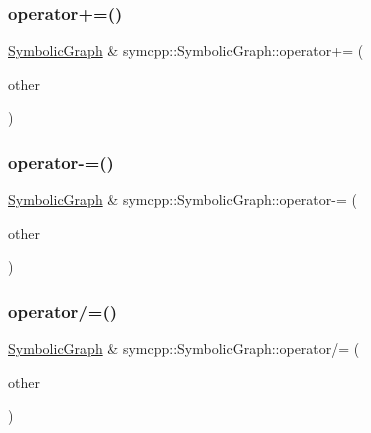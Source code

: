 \mbox{\label{classsymcpp_1_1SymbolicGraph_a9db383e72ce51ecfb967fff84d5a3723}} 
\subsubsection{\texorpdfstring{operator+=()}{operator+=()}}
{\footnotesize\ttfamily \mbox{\hyperlink{classsymcpp_1_1SymbolicGraph}{Symbolic\+Graph}} \& symcpp\+::\+Symbolic\+Graph\+::operator+= (\begin{DoxyParamCaption}\item[{const \mbox{\hyperlink{classsymcpp_1_1SymbolicGraph}{Symbolic\+Graph}} \&}]{other }\end{DoxyParamCaption})}

\mbox{\label{classsymcpp_1_1SymbolicGraph_a190dea96dae8a94610f070364f50a238}} 
\subsubsection{\texorpdfstring{operator-\/=()}{operator-=()}}
{\footnotesize\ttfamily \mbox{\hyperlink{classsymcpp_1_1SymbolicGraph}{Symbolic\+Graph}} \& symcpp\+::\+Symbolic\+Graph\+::operator-\/= (\begin{DoxyParamCaption}\item[{const \mbox{\hyperlink{classsymcpp_1_1SymbolicGraph}{Symbolic\+Graph}} \&}]{other }\end{DoxyParamCaption})}

\mbox{\label{classsymcpp_1_1SymbolicGraph_a5fc368abfd149228c614d63fd8ead1a0}} 
\subsubsection{\texorpdfstring{operator/=()}{operator/=()}}
{\footnotesize\ttfamily \mbox{\hyperlink{classsymcpp_1_1SymbolicGraph}{Symbolic\+Graph}} \& symcpp\+::\+Symbolic\+Graph\+::operator/= (\begin{DoxyParamCaption}\item[{const \mbox{\hyperlink{classsymcpp_1_1SymbolicGraph}{Symbolic\+Graph}} \&}]{other }\end{DoxyParamCaption})}

